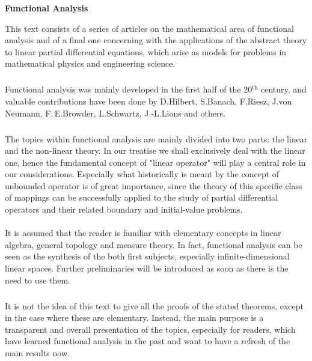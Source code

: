 \documentclass[11pt,twoside]{article}
\begin{document}
\thispagestyle{empty}

\def\Title{Functional Analysis}

\centerline{\Large{\textbf{\Title}}}
\vspace{5pt}
\centerline{\small{\textsc{\Author}}}
\vspace{20pt}



This text consists of a series of articles
on the mathematical area of {functional analysis}
and of a final one concerning with the applications of the abstract theory
to linear partial differential equations,
which arise as models for problems
in mathematical physics and engineering science.

\subparagraph{}
Functional analysis was mainly developed
in the first half of the 20$^{\textrm{th}}$ century,
and valuable contributions have been done by
{D.\;Hilbert},
{S.\;Banach},
{F.\;Riesz},
{J.\;von Neumann},
{F.\,E.\;Browder},
{L.\;Schwartz},
{J.-L.\;Lions} and others.

\subparagraph{}
The topics within functional analysis are mainly divided into two parts:
the linear and the non-linear theory.
In our treatise we shall exclusively deal with the linear one,
hence the fundamental concept of {"linear operator"}
will play a central role in our considerations.
Especially
what historically is meant by the concept of unbounded operator
is of great importance,
since the theory of this specific class of mappings can be successfully applied
to the study of partial differential operators
and their related boundary and initial-value problems.

\paragraph{}
It is assumed that
the reader is familiar with elementary concepts in linear algebra,
general topology and measure theory.
In fact,
functional analysis can be seen as the synthesis of the both first subjects,
especially {\wrt} infinite-dimensional linear spaces.
Further preliminaries
will be introduced as soon as there is the need to use them.

\subparagraph{}
It is not the idea of this text to give all the proofs of the stated theorems,
except in the case where these are elementary.
Instead,
the main purpose is a transparent and overall presentation of the topics,
especially for readers, which have learned functional analysis in the past
and want to have a refresh of the main results now.
\end{document}
